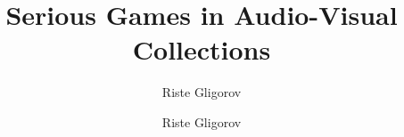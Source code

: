 \documentclass[a4paper,12pt]{book}
\author{Riste Gligorov}
\begin{document}
\frontmatter

\title{Serious Games in Audio-Visual Collections}

\author{Riste Gligorov}

\maketitle

\tableofcontents

\newcommand\T{\rule{0pt}{3ex}}
\newcommand\B{\rule[-1.6ex]{0pt}{0pt}}

\newtheorem{thesisdef}{Definition}

\newcommand{\noop}[1]{} %




\mainmatter







%

%







\begin{appendices}




\end{appendices}



\end{document}
